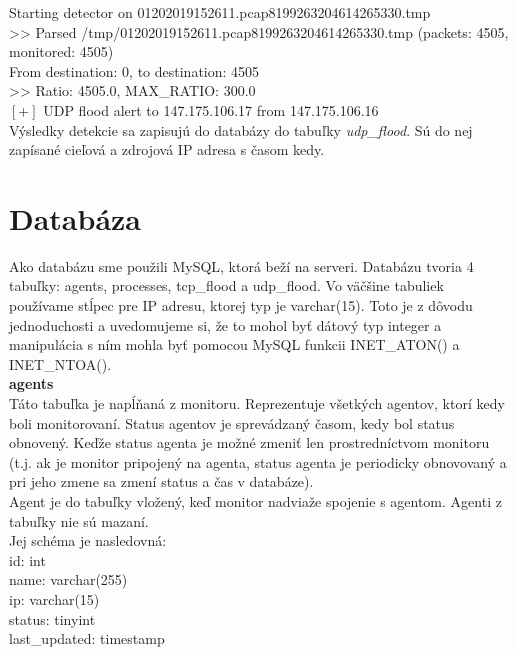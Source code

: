 \documentclass[a4paper,12pt]{article}
\begin{document}
\noindent [UDPDetection] Starting detector on 01202019152611.pcap8199263204614265330.tmp \\
>> Parsed /tmp/01202019152611.pcap8199263204614265330.tmp (packets: 4505, monitored: 4505) \\
From destination: 0, to destination: 4505 \\
>> Ratio: 4505.0, MAX\_RATIO: 300.0 \\
$[+]$ UDP flood alert to 147.175.106.17 from 147.175.106.16 \\

Výsledky detekcie sa zapisujú do databázy do tabuľky \textit{udp\_flood}. Sú do nej zapísané cieľová a zdrojová IP adresa s časom kedy. \\
\newpage

\section{Databáza}
Ako databázu sme použili MySQL, ktorá beží na serveri. Databázu tvoria 4 tabuľky: agents, processes, tcp\_flood a udp\_flood. Vo väčšine tabuliek používame stĺpec pre IP adresu, ktorej typ je varchar(15). Toto je z dôvodu jednoduchosti a uvedomujeme si, že to mohol byť dátový typ integer a manipulácia s ním mohla byť pomocou MySQL funkcii INET\_ATON() a INET\_NTOA(). \\

\textbf{agents} \\

Táto tabuľka je napĺňaná z monitoru. Reprezentuje všetkých agentov, ktorí kedy boli monitorovaní. Status agentov je sprevádzaný časom, kedy bol status obnovený. Keďže status agenta je možné zmeniť len prostredníctvom monitoru (t.j. ak je monitor pripojený na agenta, status agenta je periodicky obnovovaný a pri jeho zmene sa zmení status a čas v databáze). \\

Agent je do tabuľky vložený, keď monitor nadviaže spojenie s agentom. Agenti z tabuľky nie sú mazaní. \\

Jej schéma je nasledovná: \\

\noindent id: int \\
name: varchar(255) \\
ip: varchar(15) \\
status: tinyint \\
last\_updated: timestamp \\
\end{document}
